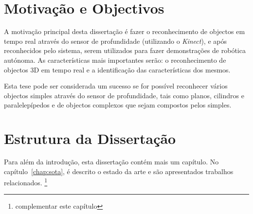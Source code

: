 \section{Motivação e Objectivos} \label{sec:goals}


A motivação principal desta dissertação é fazer o reconhecimento de objectos em tempo 
real através do sensor de profundidade (utilizando o \emph{Kinect}), e após reconhecidos
pelo sistema, serem utilizados para fazer demonstrações de robótica autónoma. As características
mais importantes serão: o reconhecimento de objectos 3D em tempo real e a identificação das
características dos mesmos.

Esta tese pode ser considerada um sucesso se for possível  reconhecer vários objectos simples
através do sensor de profundidade, tais como planos, cilindros e paralelepípedos e de objectos
complexos que sejam compostos pelos simples.


\section{Estrutura da Dissertação} \label{sec:struct}

Para além da introdução, esta dissertação contém mais um capítulo.
No capítulo~\ref{chap:sota}, é descrito o estado da arte e são
apresentados trabalhos relacionados. \footnote{complementar este capítulo}
